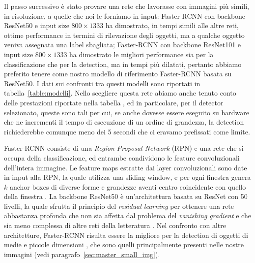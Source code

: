 Il passo successivo è stato provare una rete che lavorasse con immagini più simili, in risoluzione, a quelle che noi le forniamo in input: Faster-RCNN con backbone ResNet50 e input size $800 \times 1333$ ha dimostrato, in tempi simili alle altre reti, ottime performance in termini di rilevazione degli oggetti, ma a qualche oggetto veniva assegnata una label sbagliata; Faster-RCNN con backbone ResNet101 e input size $800 \times 1333$ ha dimostrato le migliori performance sia per la classificazione che per la detection, ma in tempi più dilatati, pertanto abbiamo preferito tenere come nostro modello di riferimento Faster-RCNN basata su ResNet50. I dati sui confronti tra questi modelli sono riportati in tabella~\ref{table:modelli}. Nello scegliere questa rete abiamo anche tenuto conto delle prestazioni riportate nella tabella \cite{modelzoo}, ed in particolare, per il detector selezionato, queste sono tali per cui, se anche dovesse essere eseguito su hardware che ne incrementi il tempo di esecuzione di un ordine di grandezza, la detection richiederebbe comunque meno dei 5 secondi che ci eravamo prefissati come limite.

Faster-RCNN consiste di una \emph{Region Proposal Network} (RPN) e una rete che si occupa della classificazione, ed entrambe condividono le feature convoluzionali dell'intera immagine. Le feature maps estratte dai layer convoluzionali sono date in input alla RPN, la quale utilizza una sliding window, e per ogni finestra genera $k$ anchor boxes di diverse forme e grandezze aventi centro coincidente con quello della finestra \cite{frcnn}. La backbone ResNet50 è un'architettura basata su ResNet con 50 livelli, la quale sfrutta il principio del \emph{residual learning} per ottenere una rete abbastanza profonda che non sia affetta dal problema del \emph{vanishing gradient} e che sia meno complessa di altre reti della letteratura \cite{resnet}. Nel confronto con altre architetture, Faster-RCNN risulta essere la migliore per la detection di oggetti di medie e piccole dimensioni \cite{speedaccuracy}, che sono quelli principalmente presenti nelle nostre immagini (vedi paragrafo~\ref{sec:master_small_img}).

